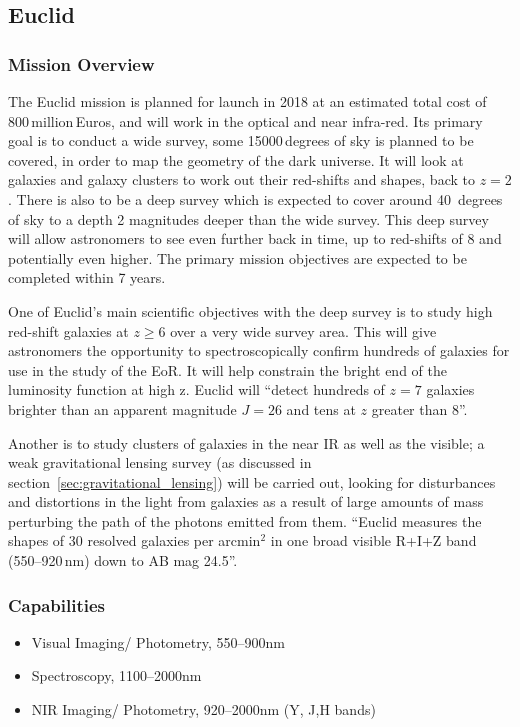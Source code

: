 
\subsection{Euclid} %
\label{sub:euclid}

	\subsubsection{Mission Overview} %
	\label{ssub:mission_overview}
		The Euclid mission is planned for launch in 2018\cite[p.~8]{Euclid_Definition_Study_Report} at an estimated total cost of 800\,million\,Euros, and will work in the optical and near infra-red\cite{bbc_euclid}. Its primary goal is to conduct a wide survey, some 15000\,degrees of sky is planned to be covered, in order to map the geometry of the dark universe. It will look at galaxies and galaxy clusters to work out their red-shifts and shapes, back to $z=2$. There is also to be a deep survey which is expected to cover around 40\, degrees of sky to a depth 2 magnitudes deeper than the wide survey. This deep survey will allow astronomers to see even further back in time, up to red-shifts of 8 and potentially even higher. The primary mission objectives are expected to be completed within 7 years.

		One of Euclid’s main scientific objectives with the deep survey is to study high red-shift galaxies at $z\ge6$ over a very wide survey area. This will give astronomers the opportunity to spectroscopically confirm hundreds of galaxies for use in the study of the EoR. It will help constrain the bright end of the luminosity function at high z. Euclid will ``detect hundreds of $z=7$ galaxies brighter than an apparent magnitude $J=26$ and tens at $z$ greater than 8''\cite{Euclid_Definition_Study_Report}.

		Another is to study clusters of galaxies in the near IR as well as the visible; a weak gravitational lensing survey (as discussed in section~\ref{sec:gravitational_lensing}) will be carried out, looking for disturbances and distortions in the light from galaxies as a result of large amounts of mass perturbing the path of the photons emitted from them. ``Euclid measures the shapes of 30 resolved galaxies per arcmin$^2$ in one broad visible R+I+Z band (550--920\,\si{\nano\metre}) down to AB mag 24.5''\cite[p.~9]{Euclid_Definition_Study_Report}.

	\subsubsection{Capabilities} %
	\label{ssub:capabilities}
		\begin{itemize}
			\item Visual Imaging/ Photometry, 550--900\si{\nano\metre}
			\item Spectroscopy, 1100--2000\si{\nano\metre}
			\item NIR Imaging/ Photometry, 920--2000\si{\nano\metre} (Y, J,H bands)
		\end{itemize}

